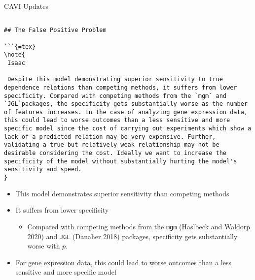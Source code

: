 \documentclass[
  ignorenonframetext,
]{beamer}
\providecommand{\tightlist}{%
  \setlength{\itemsep}{0pt}\setlength{\parskip}{0pt}}\usepackage{longtable,booktabs,array}
\begin{document}
\begin{frame}[fragile]{CAVI Updates}
\protect\hypertarget{cavi-updates-1}{}

\begin{verbatim}

## The False Positive Problem

```{=tex}
\note{
 Isaac
 
 Despite this model demonstrating superior sensitivity to true dependence relations than competing methods, it suffers from lower specificity. Compared with competing methods from the `mgm` and `JGL`packages, the specificity gets substantially worse as the number of features increases. In the case of analyzing gene expression data, this could lead to worse outcomes than a less sensitive and more specific model since the cost of carrying out experiments which show a lack of a predicted relation may be very expensive. Further, validating a true but relatively weak relationship may not be desirable considering the cost. Ideally we want to increase the specificity of the model without substantially hurting the model's sensitivity and speed.
}
\end{verbatim}

\begin{itemize}
\tightlist
\item
  This model demonstrates superior sensitivity than competing methods
\item
  It suffers from lower specificity

  \begin{itemize}
  \tightlist
  \item
    Compared with competing methods from the \texttt{mgm} (Haslbeck and
    Waldorp 2020) and \texttt{JGL} (Danaher 2018) packages, specificity
    gets substantially worse with \(p\).
  \end{itemize}
\item
  For gene expression data, this could lead to worse outcomes than a
  less sensitive and more specific model


\end{itemize}
\end{frame}
\end{document}
